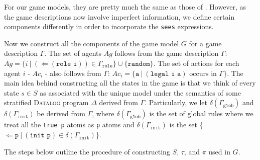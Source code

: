 \documentclass{article}
\theoremstyle{theorem}
\theoremstyle{lemma}
\theoremstyle{definition}
\theoremstyle{remark}
\begin{document}
\par For our game models, they are pretty much the same as those of \citep{GDLpaper}. However, as the game descriptions now involve imperfect information, we define certain components differently in order to incorporate the \texttt{sees} expressions.
\par Now we construct all the components of the game model $G$ for a game description $\Gamma$. The set of agents $Ag$ follows from the game description $\Gamma$: $Ag = \{i\:|\: (\Leftarrow (\texttt{role i})) \in \Gamma_\texttt{role} \} \cup \{\texttt{random}\}$. The set of actions for each agent $i$ - $Ac_i$ - also follows from $\Gamma$: $Ac_i = \{\texttt{a}\:|\: (\texttt{legal i a}) \text{ occurs in } \Gamma \}$. The main idea behind constructing all the states in the game is that we think of every state $s \in S$ as associated with the unique model under the semantics of some stratified \textsc{Datalog} program $\Delta$ derived from $\Gamma$. Particularly, we let $\delta(\Gamma_\texttt{glob})$ and $\delta(\Gamma_\texttt{init})$ be derived from $\Gamma$, where $\delta(\Gamma_\texttt{glob})$ is the set of global rules where we treat all the \texttt{true p} atoms as \texttt{p} atoms and $\delta(\Gamma_\texttt{init})$ is the set \{$\Leftarrow \texttt{p}
\:|\: (\texttt{init p}) \in \delta(\Gamma_\texttt{init})$\}.  \par The steps below outline the procedure of constructing $S$, $\tau$, and $\pi$ used in $G$.
\end{document}
